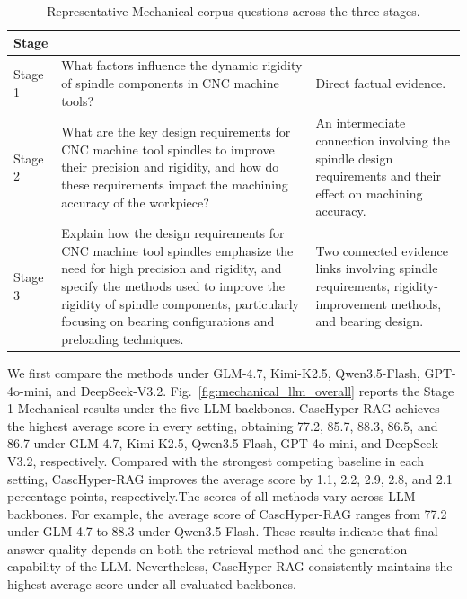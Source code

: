 \documentclass[a4paper,fleqn]{cas-dc}
\begin{document}
\begin{table}[t]
\centering
\caption{Representative Mechanical-corpus questions across the three stages.}
\label{tab:mechanical_question_examples}
\setlength{\tabcolsep}{5pt}
\small
\begin{tabular}{l>{\raggedright\arraybackslash}p{}>{\raggedright\arraybackslash}p{}}
\hline
Stage & \multicolumn{1}{c}{Representative question} & \multicolumn{1}{c}{Evidence requirement} \\
\hline
Stage 1 & What factors influence the dynamic rigidity of spindle components in CNC machine tools? & Direct factual evidence. \\
Stage 2 & What are the key design requirements for CNC machine tool spindles to improve their precision and rigidity, and how do these requirements impact the machining accuracy of the workpiece? & An intermediate connection involving the spindle design requirements and their effect on machining accuracy. \\
Stage 3 & Explain how the design requirements for CNC machine tool spindles emphasize the need for high precision and rigidity, and specify the methods used to improve the rigidity of spindle components, particularly focusing on bearing configurations and preloading techniques. & Two connected evidence links involving spindle requirements, rigidity-improvement methods, and bearing design. \\
\hline
\end{tabular}
\end{table}

We first compare the methods under GLM-4.7, Kimi-K2.5, Qwen3.5-Flash, GPT-4o-mini, and DeepSeek-V3.2. Fig.~\ref{fig:mechanical_llm_overall} reports the Stage 1 Mechanical results under the five LLM backbones. CascHyper-RAG achieves the highest average score in every setting, obtaining 77.2, 85.7, 88.3, 86.5, and 86.7 under GLM-4.7, Kimi-K2.5, Qwen3.5-Flash, GPT-4o-mini, and DeepSeek-V3.2, respectively. Compared with the strongest competing baseline in each setting, CascHyper-RAG improves the average score by 1.1, 2.2, 2.9, 2.8, and 2.1 percentage points, respectively.The scores of all methods vary across LLM backbones. For example, the average score of CascHyper-RAG ranges from 77.2 under GLM-4.7 to 88.3 under Qwen3.5-Flash. These results indicate that final answer quality depends on both the retrieval method and the generation capability of the LLM. Nevertheless, CascHyper-RAG consistently maintains the highest average score under all evaluated backbones.
\end{document}
